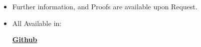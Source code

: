 \documentclass[letterpaper,MMMyyyy,nonstopmode]{simpleresumecv}
\begin{document}
\begin{Body}
\Entry
\begin{itemize}
\item
Further information, and Proofs are available upon Request.
\item
All Available in:

\href{https://github.com/Yasaman1997} {\textbf{Github}}  




\end{itemize}









\end{Body}

\end{document}
